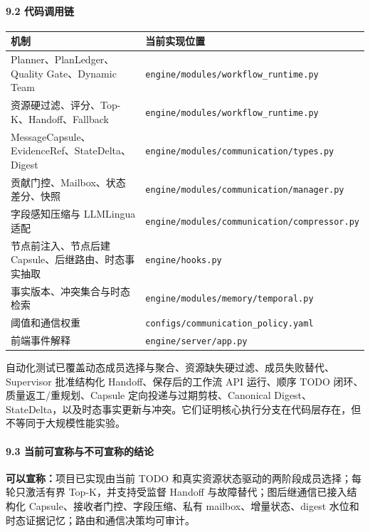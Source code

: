 \documentclass[UTF8,a4paper,12pt]{ctexart}
\begin{document}
\paragraph{9.2 代码调用链}

\begin{longtable}[]{@{}
  >{\raggedright\arraybackslash}p{}
  >{\raggedright\arraybackslash}p{}@{}}
\toprule
机制 & 当前实现位置 \\
\midrule
\endhead
Planner、PlanLedger、Quality Gate、Dynamic Team & \texttt{engine/modules/workflow\_runtime.py} \\
资源硬过滤、评分、Top-K、Handoff、Fallback & \texttt{engine/modules/workflow\_runtime.py} \\
MessageCapsule、EvidenceRef、StateDelta、Digest & \texttt{engine/modules/communication/types.py} \\
贡献门控、Mailbox、状态差分、快照 & \texttt{engine/modules/communication/manager.py} \\
字段感知压缩与 LLMLingua 适配 & \texttt{engine/modules/communication/compressor.py} \\
节点前注入、节点后建 Capsule、后继路由、时态事实抽取 & \texttt{engine/hooks.py} \\
事实版本、冲突集合与时态检索 & \texttt{engine/modules/memory/temporal.py} \\
阈值和通信权重 & \texttt{configs/communication\_policy.yaml} \\
前端事件解释 & \texttt{engine/server/app.py} \\
\bottomrule
\end{longtable}

自动化测试已覆盖动态成员选择与聚合、资源缺失硬过滤、成员失败替代、Supervisor 批准结构化 Handoff、保存后的工作流 API 运行、顺序 TODO 闭环、质量返工/重规划、Capsule 定向投递与过期剪枝、Canonical Digest、StateDelta，以及时态事实更新与冲突。它们证明核心执行分支在代码层存在，但不等同于大规模性能实验。

\paragraph{9.3 当前可宣称与不可宣称的结论}

\textbf{可以宣称：}项目已实现由当前 TODO 和真实资源状态驱动的两阶段成员选择；每轮只激活有界 Top-K，并支持受监督 Handoff 与故障替代；图后继通信已接入结构化 Capsule、接收者门控、字段压缩、私有 mailbox、增量状态、digest 水位和时态证据记忆；路由和通信决策均可审计。
\end{document}
